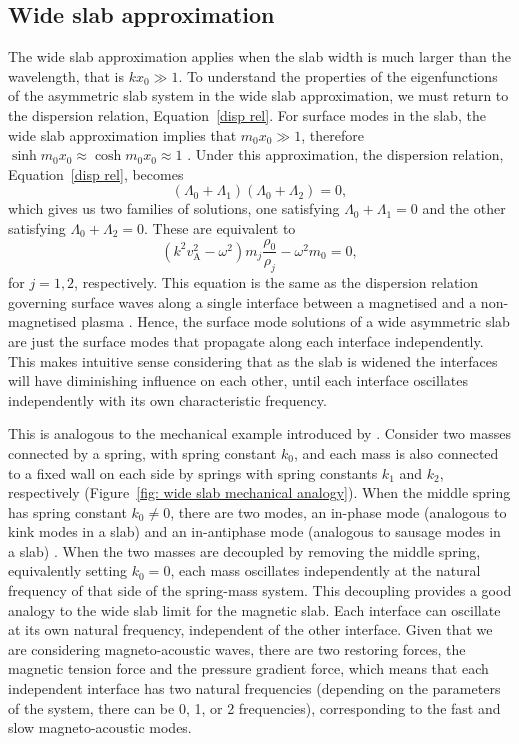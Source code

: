 \documentclass[namedreferences]{solarphysics}
\numberwithin{equation}{section}
\begin{document}
\begin{article}
\subsection{Wide slab approximation} \label{sec: AR wide slab}
The wide slab approximation applies when the slab width is much larger than the wavelength, that is $kx_0 \gg 1$. To understand the properties of the eigenfunctions of the asymmetric slab system in the wide slab approximation, we must return to the dispersion relation, Equation~\eqref{disp rel}. For surface modes in the slab, the wide slab approximation implies that $m_0x_0 \gg 1$, therefore ${\sinh{m_0x_0} \approx \cosh{m_0x_0} \approx 1}$ \citep{rob81b}. Under this approximation, the dispersion relation, Equation~\eqref{disp rel}, becomes
\begin{equation}
(\Lambda_0 + \Lambda_1)(\Lambda_0 + \Lambda_2) = 0,
\end{equation}
which gives us two families of solutions, one satisfying $\Lambda_0 + \Lambda_1 = 0$ and the other satisfying $\Lambda_0 + \Lambda_2 = 0$. These are equivalent to
\begin{equation}
(k^2v_\textrm{A}^2 - \omega^2)m_j\frac{\rho_0}{\rho_j} - \omega^2m_0 = 0,
\end{equation}
for $j = 1, 2$, respectively. This equation is the same as the dispersion relation governing surface waves along a single interface between a magnetised and a non-magnetised plasma \citep{rob81a}. Hence, the surface mode solutions of a wide asymmetric slab are just the surface modes that propagate along each interface independently. This makes intuitive sense considering that as the slab is widened the interfaces will have diminishing influence on each other, until each interface oscillates independently with its own characteristic frequency.

This is analogous to the mechanical example introduced by \citealp{all_etal17}. Consider two masses connected by a spring, with spring constant $k_0$, and each mass is also connected to a fixed wall on each side by springs with spring constants $k_1$ and $k_2$, respectively (Figure~\ref{fig: wide slab mechanical analogy}). When the middle spring has spring constant $k_0 \neq 0$, there are two modes, an in-phase mode (analogous to kink modes in a slab) and an in-antiphase mode (analogous to sausage modes in a slab) \citep{all_etal17}. When the two masses are decoupled by removing the middle spring, equivalently setting $k_0 = 0$, each mass oscillates independently at the natural frequency of that side of the spring-mass system. This decoupling provides a good analogy to the wide slab limit for the magnetic slab. Each interface can oscillate at its own natural frequency, independent of the other interface. Given that we are considering magneto-acoustic waves, there are two restoring forces, the magnetic tension force and the pressure gradient force, which means that each independent interface has two natural frequencies (depending on the parameters of the system, there can be 0, 1, or 2 frequencies), corresponding to the fast and slow magneto-acoustic modes.


\end{article}
\end{document}

